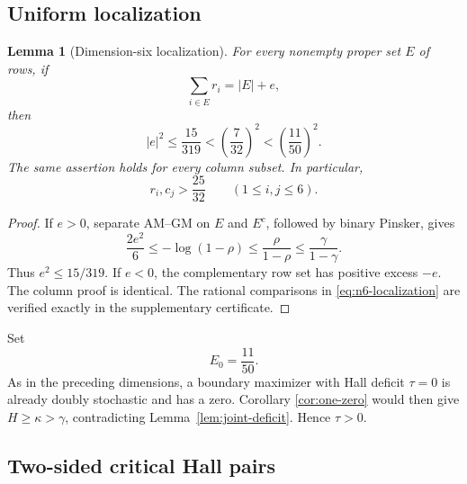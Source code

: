 \documentclass[11pt,a4paper]{article}
\numberwithin{equation}{section}
\newtheorem{lemma}[theorem]{Lemma}
\theoremstyle{definition}
\newcommand{\1}{\mathbf{1}}
\begin{document}
\subsection{Uniform localization}

\begin{lemma}[Dimension-six localization]\label{lem:n6-localization}
For every nonempty proper set $E$ of rows, if
\[
 \sum_{i\in E}r_i=|E|+e,
\]
then
\begin{equation}\label{eq:n6-localization}
 |e|^2\le\frac{15}{319}
 <\left(\frac7{32}\right)^2
 <\left(\frac{11}{50}\right)^2.
\end{equation}
The same assertion holds for every column subset.  In particular,
\begin{equation}\label{eq:n6-singleton-lower}
 r_i,c_j>\frac{25}{32}\qquad(1\le i,j\le6).
\end{equation}
\end{lemma}

\begin{proof}
If $e>0$, separate AM--GM on $E$ and $E^c$, followed by binary Pinsker,
gives
\[
 \frac{2e^2}{6}\le-\log(1-\rho)
 \le\frac{\rho}{1-\rho}
 \le\frac{\gamma}{1-\gamma}.
\]
Thus $e^2\le15/319$.  If $e<0$, the complementary row set has positive
excess $-e$.  The column proof is identical.  The rational comparisons in
\eqref{eq:n6-localization} are verified exactly in the supplementary
certificate.
\end{proof}

Set
\begin{equation}\label{eq:n6-E0}
 E_0=\frac{11}{50}.
\end{equation}
As in the preceding dimensions, a boundary maximizer with Hall deficit
$\tau=0$ is already doubly stochastic and has a zero.  Corollary
\ref{cor:one-zero} would then give $H\ge\kappa>\gamma$, contradicting
Lemma~\ref{lem:joint-deficit}.  Hence $\tau>0$.

\subsection{Two-sided critical Hall pairs}
\end{document}
